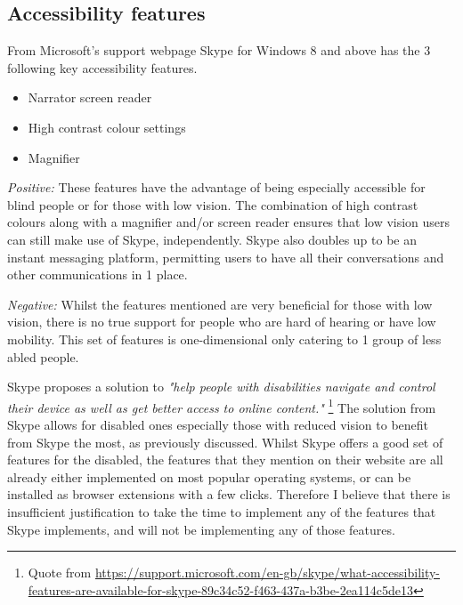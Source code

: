 \subsection*{Accessibility features}

From Microsoft's support webpage Skype for 
Windows 8 and above has the 3 following key accessibility 
features.

\begin{itemize}
  \item Narrator screen reader
  \item High contrast colour settings
  \item Magnifier
\end{itemize}

\textit{Positive:}
These features have the advantage of being especially 
accessible for blind people or for those with low vision. The 
combination of high contrast colours along with a magnifier 
and/or screen reader ensures that low vision users can still 
make use of Skype, independently. Skype also doubles up to be
an instant messaging platform, permitting users to have all 
their conversations and other communications in 1 place.

\vspace{0.2cm}

\textit{Negative:}
Whilst the features mentioned are very beneficial for those 
with low vision, there is no true support for people who are
hard of hearing or have low mobility. This set of features is 
one-dimensional only catering to 1 group of less abled people.

\vspace{0.2cm}

Skype proposes a solution to \textit{"help people with 
disabilities navigate and control their device as well as get
better access to online content."} 
\footnote{Quote from
\url{https://support.microsoft.com/en-gb/skype/what-accessibility-features-are-available-for-skype-89c34c52-f463-437a-b3be-2ea114c5de13}}
The solution from Skype allows for disabled ones especially 
those with reduced vision to benefit from Skype the most, as 
previously discussed. Whilst Skype offers a good set of
features for the disabled, the features that they mention on 
their website are all already either implemented on most 
popular operating systems, or can be installed as browser 
extensions with a few clicks. Therefore I believe that there is
insufficient justification to take the time to implement any 
of the features that Skype implements, and will not be 
implementing any of those features.

